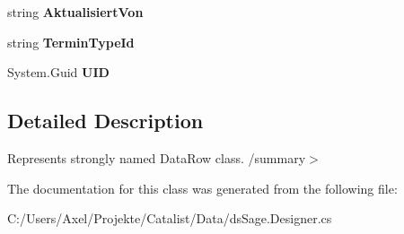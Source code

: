 \begin{DoxyCompactItemize}
\item 
string {\bfseries Aktualisiert\+Von}\hypertarget{class_products_1_1_data_1_1ds_sage_1_1_termin_link_xref_row_a40b533ca61c485208ae6781354e927e3}{}\label{class_products_1_1_data_1_1ds_sage_1_1_termin_link_xref_row_a40b533ca61c485208ae6781354e927e3}

\item 
string {\bfseries Termin\+Type\+Id}\hypertarget{class_products_1_1_data_1_1ds_sage_1_1_termin_link_xref_row_af4a5867bf5b1e9b7bb0c927c54b6ce10}{}\label{class_products_1_1_data_1_1ds_sage_1_1_termin_link_xref_row_af4a5867bf5b1e9b7bb0c927c54b6ce10}

\item 
System.\+Guid {\bfseries U\+ID}\hypertarget{class_products_1_1_data_1_1ds_sage_1_1_termin_link_xref_row_a40b9074a66d2633aedd9393617fe7092}{}\label{class_products_1_1_data_1_1ds_sage_1_1_termin_link_xref_row_a40b9074a66d2633aedd9393617fe7092}

\end{DoxyCompactItemize}


\subsection{Detailed Description}
Represents strongly named Data\+Row class. /summary$>$ 

The documentation for this class was generated from the following file\+:\begin{DoxyCompactItemize}
\item 
C\+:/\+Users/\+Axel/\+Projekte/\+Catalist/\+Data/ds\+Sage.\+Designer.\+cs\end{DoxyCompactItemize}
